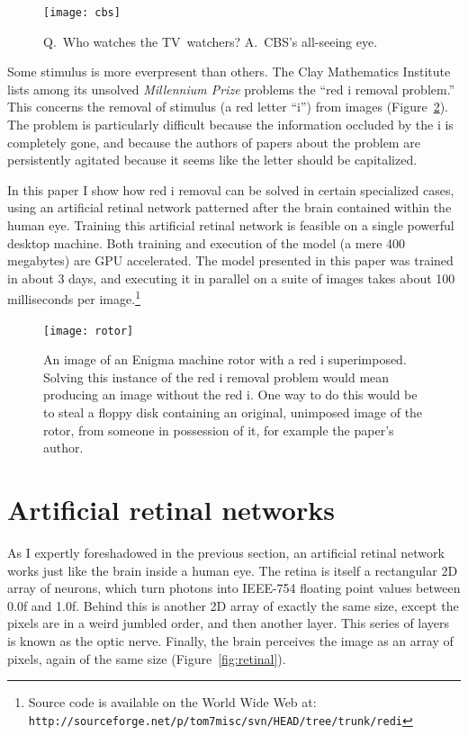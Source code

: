\documentclass[twocolumn]{article}
\begin{document}
\begin{figure}[t]
\begin{center}
\texttt{[image: cbs]}
\end{center}
\caption{Q.~Who watches the TV~watchers?
A.~CBS's all-seeing eye.} \label{fig:cbs}
\end{figure}

Some stimulus is more everpresent than others. The Clay Mathematics
Institute lists among its unsolved {\em Millennium Prize} problems the
``red i removal problem.'' This concerns the removal of stimulus (a
red letter ``i'') from images (Figure~\ref{fig:redi}). The problem
is particularly difficult because the information occluded by the
i is completely gone, and because the authors of papers about the
problem are persistently agitated because it seems like the letter
should be capitalized.

In this paper I show how red i removal can be solved in certain
specialized cases, using an artificial retinal network patterned after
the brain contained within the human eye. Training this artificial
retinal network is feasible on a single powerful desktop machine. Both
training and execution of the model (a mere 400 megabytes) are GPU
accelerated. The model presented in this paper was trained in about 3
days, and executing it in parallel on a suite of images takes about
100 milliseconds per image.\!\footnote{Source code is available on
the World Wide Web at:
{\tt http://sourceforge.net/p/tom7misc/svn/HEAD/tree/trunk/redi}}

\begin{figure}[tb]
\begin{center}
\texttt{[image: rotor]}
\end{center}
\caption{An image of an Enigma machine rotor with a red i
 superimposed. Solving this instance of the red i removal problem
 would mean producing an image without the red i. One way to do this
 would be to steal a floppy disk containing an original, unimposed
 image of the rotor, from someone in possession of it, for example
 the paper's author.} \label{fig:redi}
\end{figure}

\section{Artificial retinal networks}

As I expertly foreshadowed in the previous section, an artificial
retinal network works just like the brain inside a human eye. The
retina is itself a rectangular 2D array of neurons, which turn photons
into IEEE-754 floating point values between 0.0f and 1.0f. Behind this
is another 2D array of exactly the same size, except the pixels are in
a weird jumbled order, and then another layer. This series of layers
is known as the optic nerve. Finally, the brain perceives the image as
an array of pixels, again of the same size (Figure~\ref{fig:retinal}).
\end{document}
